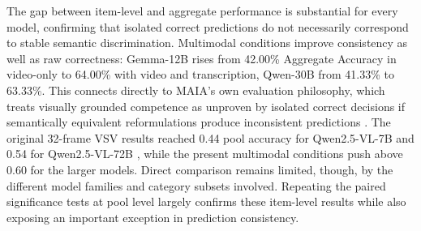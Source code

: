 The gap between item-level and aggregate performance is substantial for every model, confirming that isolated correct predictions do not necessarily correspond to stable semantic discrimination. Multimodal conditions improve consistency as well as raw correctness: Gemma-12B rises from 42.00\% Aggregate Accuracy in video-only to 64.00\% with video and transcription, Qwen-30B from 41.33\% to 63.33\%. This connects directly to MAIA's own evaluation philosophy, which treats visually grounded competence as unproven by isolated correct decisions if semantically equivalent reformulations produce inconsistent predictions \cite{testa2025maia}. The original 32-frame VSV results reached 0.44 pool accuracy for Qwen2.5-VL-7B and 0.54 for Qwen2.5-VL-72B \cite{testa2025maia}, while the present multimodal conditions push above 0.60 for the larger models. Direct comparison remains limited, though, by the different model families and category subsets involved.
Repeating the paired significance tests at pool level largely confirms these item-level results while also exposing an important exception in prediction consistency.
\begin{table}[ht]
    \centering
    \small
    \caption{Exact McNemar comparisons at pool level using Aggregate Accuracy.}
    \label{tab:mcnemar_aggregate}
\end{table}
